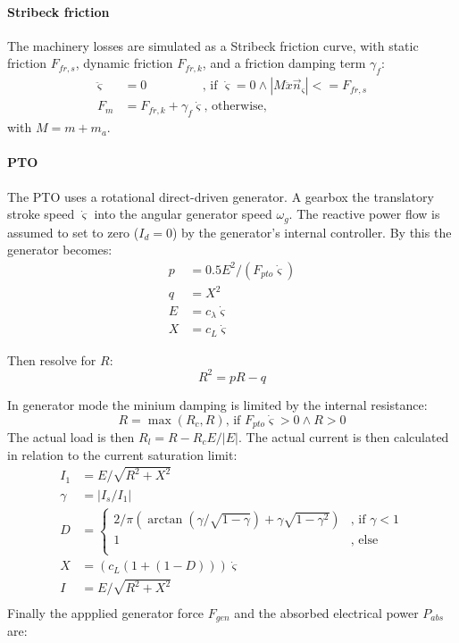 \documentclass[oneside,10pt,a4paper]{book}
\begin{document}
\paragraph{Stribeck friction}
The machinery losses are simulated as a Stribeck friction curve, with static friction $F_{fr,s}$, dynamic friction $F_{fr,k}$, and a friction damping term $\gamma_f$:
\begin{align}
	\ddot{\varsigma}&=0\phantom{................} \text{, if }\dot{\varsigma}=0 \wedge |M\ddot{x}\vec{n}_{\varsigma}| <= F_{fr,s}\\
	F_{m}&=F_{fr,k}+\gamma_f \dot{\varsigma} \text{, otherwise,}
\end{align}
with $M=m+m_a$.
\paragraph{PTO}
The PTO uses a rotational direct-driven generator. A gearbox the translatory stroke speed $\dot{\varsigma}$ into the angular generator speed $\omega_g$. The reactive power flow is assumed to set to zero ($I_d=0$) by the generator's internal controller. By this the generator becomes:
\begin{align}
	p&=0.5 E^2/(F_{pto} \dot{\varsigma})\\
	q&=X^2\\
	E&=c_\lambda \dot{\varsigma}\\
	X&=c_L\dot{\varsigma}
\end{align}


Then resolve for $R$:
\begin{equation}
	R^2=p R-q
\end{equation}

In generator mode the minium damping is limited by the internal resistance:
\begin{equation}
	R=\max(R_c,R)\text{, if }F_{pto}\dot{\varsigma}>0 \wedge R>0
\end{equation}
The actual load is then $R_l=R-R_c E/|E|$. The actual current is then calculated in relation to the current saturation limit:
\begin{align}
	I_1&=E/\sqrt{R^2+X^2}\\
	\gamma&=|I_s/I_1|\\
	D&=
	\begin{cases}
		2/\pi(\arctan(\gamma/\sqrt{1-\gamma})+\gamma \sqrt{1-\gamma^2})&\text{, if } \gamma<1\\	
		1&\text{, else}\\
	\end{cases}\\
	X&=(c_L (1+(1-D)))\dot{\varsigma}\\
	I&=E/\sqrt{R^2+X^2}\\
\end{align}
Finally the appplied generator force $F_{gen}$ and the absorbed electrical power $P_{abs}$ are:
\end{document}
